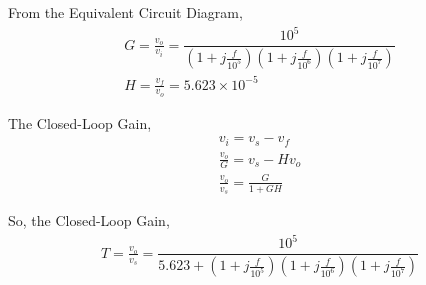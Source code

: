\begin{enumerate}[label=\thesection.\arabic*.,ref=\thesection.\theenumi]
From the Equivalent Circuit Diagram,
\begin{align}
G = \frac{v_{o}}{v_{i}} = \dfrac{10^5}{\left(1+j\frac{f}{10^{5}}\right)\left(1+j\frac{f}{10^{6}}\right)\left(1+j\frac{f}{10^{7}}\right)}\\
H = \frac{v_{f}}{v_{o}} = 5.623 \times 10^{-5}
\end{align}

The Closed-Loop Gain,
\begin{align}
v_{i} = v_{s} - v_{f}\\
\frac{v_{o}}{G} = v_{s} - Hv_{o}\\
\frac{v_{o}}{v_{s}} = \frac{G}{1+GH}
\end{align}

So, the Closed-Loop Gain,
\begin{align}
T = \frac{v_{o}}{v_{s}} = \dfrac{10^5}{5.623 + \left(1+j\frac{f}{10^{5}}\right)\left(1+j\frac{f}{10^{6}}\right)\left(1+j\frac{f}{10^{7}}\right)}
\end{align}

\end{enumerate}

